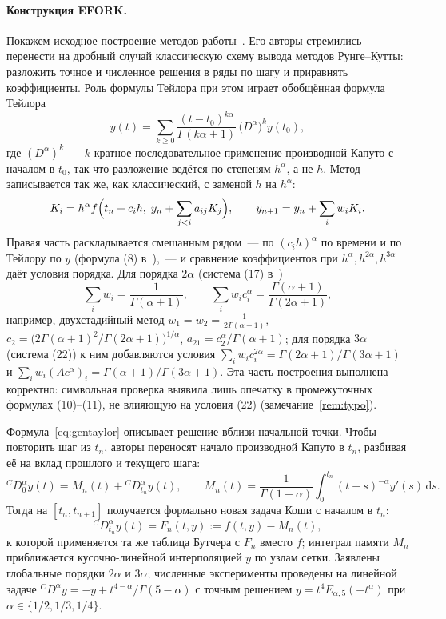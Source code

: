 \documentclass[11pt,a4paper]{article}
\theoremstyle{plain}
\theoremstyle{definition}
\newcommand{\G}{\Gamma}
\newcommand{\dd}{\,\mathrm{d}}
\begin{document}
\paragraph{Конструкция EFORK.} Покажем исходное построение методов работы~\cite{Ghaffari2023}. Его авторы стремились перенести на дробный случай классическую схему вывода методов Рунге--Кутты: разложить точное и численное решения в ряды по шагу и приравнять коэффициенты. Роль формулы Тейлора при этом играет обобщённая формула Тейлора~\cite{OdibatShawagfeh2007}
\begin{equation}\label{eq:gentaylor}
y(t)=\sum_{k\ge0}\frac{(t-t_0)^{k\alpha}}{\G(k\alpha+1)}\,\bigl(D^{\alpha}\bigr)^ky(t_0),
\end{equation}
где $(D^{\alpha})^k$~--- $k$-кратное последовательное применение производной Капуто с началом в $t_0$, так что разложение ведётся по степеням $h^{\alpha}$, а не $h$. Метод записывается так же, как классический, с заменой $h$ на $h^{\alpha}$:
\[
K_i=h^{\alpha}f\Bigl(t_n+c_ih,\;y_n+\sum_{j<i}a_{ij}K_j\Bigr),\qquad y_{n+1}=y_n+\sum_i w_iK_i .
\]
Правая часть раскладывается смешанным рядом~--- по $(c_ih)^{\alpha}$ по времени и по Тейлору по $y$ (формула (8) в~\cite{Ghaffari2023}),~--- и сравнение коэффициентов при $h^{\alpha},h^{2\alpha},h^{3\alpha}$ даёт условия порядка. Для порядка $2\alpha$ (система (17) в~\cite{Ghaffari2023})
\[
\sum_iw_i=\frac{1}{\G(\alpha+1)},\qquad \sum_iw_ic_i^{\alpha}=\frac{\G(\alpha+1)}{\G(2\alpha+1)},
\]
например, двухстадийный метод $w_1=w_2=\frac{1}{2\G(\alpha+1)}$, $c_2=\bigl(2\G(\alpha+1)^2/\G(2\alpha+1)\bigr)^{1/\alpha}$, $a_{21}=c_2^{\alpha}/\G(\alpha+1)$; для порядка $3\alpha$ (система (22)) к ним добавляются условия $\sum_iw_ic_i^{2\alpha}=\G(2\alpha+1)/\G(3\alpha+1)$ и $\sum_iw_i(Ac^{\alpha})_i=\G(\alpha+1)/\G(3\alpha+1)$. Эта часть построения выполнена корректно: символьная проверка выявила лишь опечатку в промежуточных формулах (10)--(11), не влияющую на условия (22) (замечание~\ref{rem:typo}).

Формула~\eqref{eq:gentaylor} описывает решение вблизи начальной точки. Чтобы повторить шаг из $t_n$, авторы переносят начало производной Капуто в $t_n$, разбивая её на вклад прошлого и текущего шага:
\begin{equation}\label{eq:shift}
{}^{C}\!D^{\alpha}_{0}y(t)=M_n(t)+{}^{C}\!D^{\alpha}_{t_n}y(t),\qquad
M_n(t)=\frac{1}{\G(1-\alpha)}\int_0^{t_n}(t-s)^{-\alpha}y'(s)\dd s .
\end{equation}
Тогда на $[t_n,t_{n+1}]$ получается формально новая задача Коши с началом в $t_n$:
\[
{}^{C}\!D^{\alpha}_{t_n}y(t)=F_n(t,y):=f(t,y)-M_n(t),
\]
к которой применяется та же таблица Бутчера с $F_n$ вместо $f$; интеграл памяти $M_n$ приближается кусочно-линейной интерполяцией $y$ по узлам сетки. Заявлены глобальные порядки $2\alpha$ и $3\alpha$; численные эксперименты проведены на линейной задаче ${}^{C}\!D^{\alpha}y=-y+t^{4-\alpha}/\G(5-\alpha)$ с точным решением $y=t^4E_{\alpha,5}(-t^{\alpha})$ при $\alpha\in\{1/2,1/3,1/4\}$.
\end{document}
